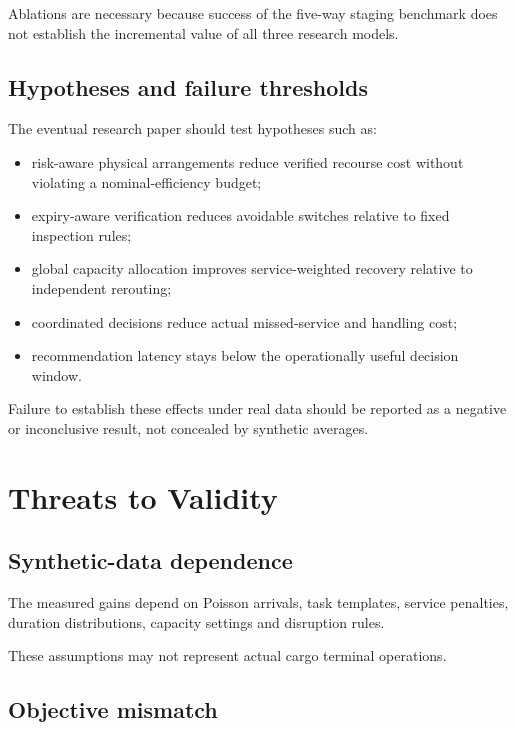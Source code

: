\documentclass[10pt,a4paper]{article}
\theoremstyle{plain}
\theoremstyle{definition}
\theoremstyle{remark}
\begin{document}
Ablations are necessary because
success of the five-way staging benchmark
does not establish the incremental value
of all three research models.

\subsection{Hypotheses and failure thresholds}

The eventual research paper should test
hypotheses such as:

\begin{itemize}[leftmargin=18pt,itemsep=2pt]
\item
risk-aware physical arrangements reduce
verified recourse cost
without violating a nominal-efficiency budget;
\item
expiry-aware verification reduces
avoidable switches
relative to fixed inspection rules;
\item
global capacity allocation improves
service-weighted recovery
relative to independent rerouting;
\item
coordinated decisions reduce
actual missed-service and handling cost;
\item
recommendation latency stays below
the operationally useful decision window.
\end{itemize}

Failure to establish these effects
under real data should be reported
as a negative or inconclusive result,
not concealed by synthetic averages.

\section{Threats to Validity}

\subsection{Synthetic-data dependence}

The measured gains depend on
Poisson arrivals,
task templates,
service penalties,
duration distributions,
capacity settings
and disruption rules.

These assumptions may not represent
actual cargo terminal operations.

\subsection{Objective mismatch}
\end{document}
